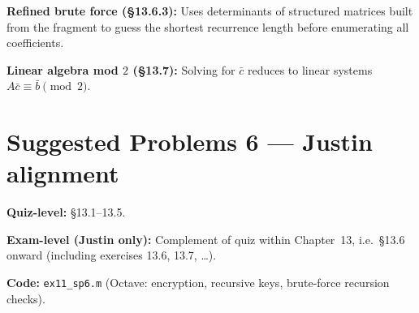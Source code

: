 \textbf{Refined brute force (\S13.6.3):} Uses determinants of structured matrices built from the fragment to guess the shortest recurrence length before enumerating all coefficients.

\textbf{Linear algebra mod $2$ (\S13.7):} Solving for $\bar{c}$ reduces to linear systems $A\bar{c}\equiv \bar{b}\pmod 2$.

\section{Suggested Problems 6 --- Justin alignment}

\noindent\textbf{Quiz-level:} \S13.1--13.5.

\noindent\textbf{Exam-level (Justin only):} Complement of quiz within Chapter~13, i.e.\ \S13.6 onward (including exercises 13.6, 13.7, \ldots).

\noindent\textbf{Code:} \texttt{ex11\_sp6.m} (Octave: encryption, recursive keys, brute-force recursion checks).
